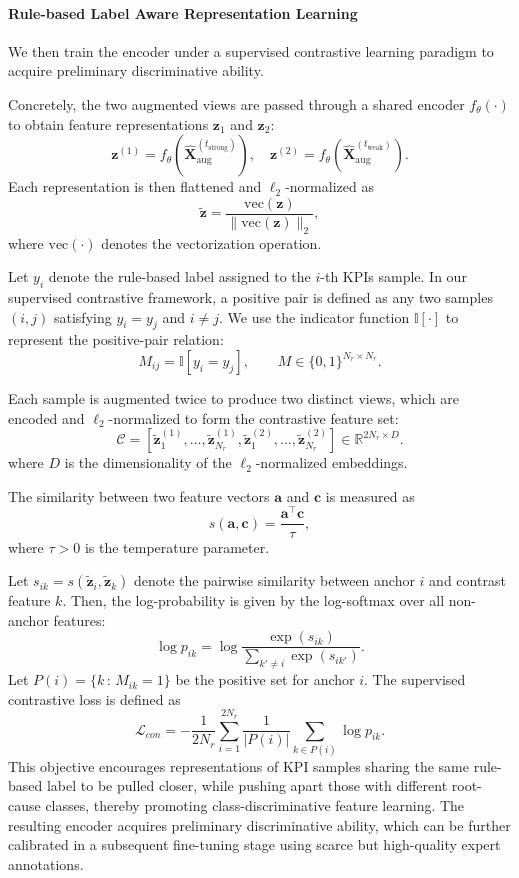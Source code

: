 \documentclass[lettersize,journal]{IEEEtran}
\begin{document}
\paragraph{Rule-based Label Aware Representation Learning}
We then train the encoder under a supervised contrastive learning paradigm to acquire preliminary discriminative ability.


Concretely, the two augmented views are passed through a shared encoder $f_\theta(\cdot)$ to obtain feature representations $\mathbf{z}_1$ and $\mathbf{z}_2$:
\[
\mathbf{z}^{(1)} = f_\theta\!\left(\hat{\mathbf{X}}_{\mathrm{aug}}^{(t_{\mathrm{strong}})}\right), \quad
\mathbf{z}^{(2)} = f_\theta\!\left(\hat{\mathbf{X}}_{\mathrm{aug}}^{(t_{\mathrm{weak}})}\right).
\]
Each representation is then flattened and $\ell_2$-normalized as
\[
\tilde{\mathbf{z}} = \frac{\mathrm{vec}(\mathbf{z})}{\lVert \mathrm{vec}(\mathbf{z}) \rVert_2},
\]
where $\mathrm{vec}(\cdot)$ denotes the vectorization operation.


Let $y_i$ denote the rule-based label assigned to the $i$-th KPIs sample. 
In our supervised contrastive framework, a positive pair is defined as any two samples $(i,j)$ satisfying $y_i = y_j$ and $i \neq j$. 
We use the indicator function $\mathbb{I}[\cdot]$ to represent the positive-pair relation:
\[
M_{ij} = \mathbb{I}[y_i = y_j], \qquad M \in \{0,1\}^{N_r \times N_r}.
\]

Each sample is augmented twice to produce two distinct views, which are encoded and $\ell_2$-normalized to form the contrastive feature set:
\[
\mathcal{C} = \left[ \tilde{\mathbf{z}}^{(1)}_1, \dots, \tilde{\mathbf{z}}^{(1)}_{N_r}, 
\tilde{\mathbf{z}}^{(2)}_1, \dots, \tilde{\mathbf{z}}^{(2)}_{N_r} \right] 
\in \mathbb{R}^{2N_r \times D}.
\]
where $D$ is the dimensionality of the $\ell_2$-normalized embeddings.

The similarity between two feature vectors $\mathbf{a}$ and $\mathbf{c}$ is measured as
\[
s(\mathbf{a},\mathbf{c}) = \frac{\mathbf{a}^\top \mathbf{c}}{\tau},
\]
where $\tau>0$ is the temperature parameter.

Let $s_{ik} = s(\tilde{\mathbf{z}}_i, \tilde{\mathbf{z}}_k)$ 
denote the pairwise similarity between anchor $i$ and contrast feature $k$.
Then, the log-probability is given by the log-softmax over all non-anchor features:
\[
\log p_{ik} = \log \frac{\exp(s_{ik})}{\sum_{k' \neq i} \exp(s_{ik'})}.
\]
Let $P(i) = \{ k \,:\, M_{ik} = 1 \}$ be the positive set for anchor $i$. 
The supervised contrastive loss is defined as
\begin{equation}
\mathcal{L}_{con} = - \frac{1}{2N_r} \sum_{i=1}^{2N_r} 
\frac{1}{|P(i)|} \sum_{k \in P(i)} \log p_{ik}.
\end{equation}
This objective encourages representations of KPI samples sharing the same rule-based label to be pulled closer, while pushing apart those with different root-cause classes, thereby promoting class-discriminative feature learning. The resulting encoder acquires preliminary discriminative ability, which can be further calibrated in a subsequent fine-tuning stage using scarce but high-quality expert annotations.
\end{document}
